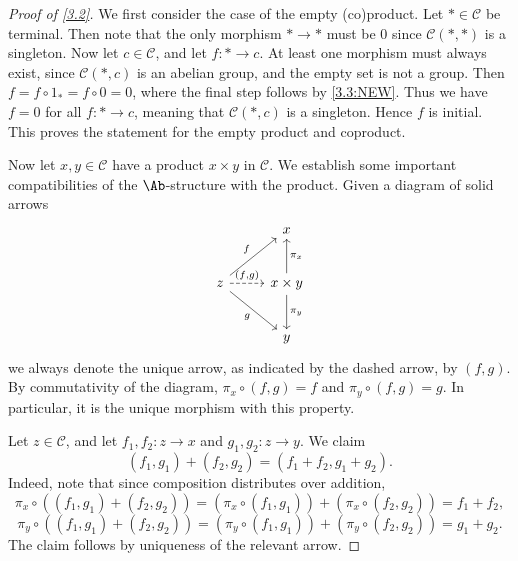 \begin{proof}[Proof of \cref{3.2}]
	We first consider the case of the empty (co)product. Let $*\in \mathcal{C} $ be terminal. Then note that the only morphism $*\to *$ must be 0 since $\mathcal{C} (*,*)$ is a singleton. Now let $c\in \mathcal{C} $, and let $f : *\to c$. At least one morphism must always exist, since $\mathcal{C} (*,c)$ is an abelian group, and the empty set is not a group. Then $f=f\circ 1_* = f\circ 0=0$, where the final step follows by \cref{3.3:NEW}. Thus we have $f=0$ for all $f : * \to c$, meaning that $\mathcal{C} (*,c)$ is a singleton. Hence $f$ is initial. This proves the statement for the empty product and coproduct.

	Now let $x,y\in \mathcal{C} $ have a product $x\times y$ in $\mathcal{C} $. We establish some important compatibilities of the $\Ab $-structure with the product. Given a diagram of solid arrows
	\[\begin{tikzcd}[row sep = 2.5em, column sep = 2.5em]
	 & x \\
	z \ar[" f ", ur] \ar[" g "', dr] \ar[" (f\text{,} g) ", dashed, r]  & x\times y \ar[" \pi _x "', u] \ar[" \pi _y ", d]  \\
	 & y
	\end{tikzcd}\]
	we always denote the unique arrow, as indicated by the dashed arrow, by $(f,g)$. By commutativity of the diagram, $\pi _x \circ (f,g)=f$ and $\pi _y \circ (f,g)=g$. In particular, it is the unique morphism with this property.

	Let $z\in \mathcal{C} $, and let $f_1,f_2 : z \to x$ and $g_1,g_2 : z \to y$. We claim 
	\begin{equation}\label{eq:1}
		(f_1,g_1)+(f_2,g_2)=(f_1+f_2,g_1+g_2).\tag{$\star $}
	\end{equation}
	Indeed, note that since composition distributes over addition,
	\[
		\pi _x\circ ((f_1,g_1)+(f_2,g_2))=(\pi _x \circ (f_1,g_1))+(\pi _x \circ (f_2,g_2))=f_1 + f_2,
	\]
	\[
		\pi _y\circ ((f_1,g_1)+(f_2,g_2))=(\pi _y \circ (f_1,g_1))+(\pi _y \circ (f_2,g_2))=g_1 + g_2
	.\]
	The claim follows by uniqueness of the relevant arrow.


\end{proof}
